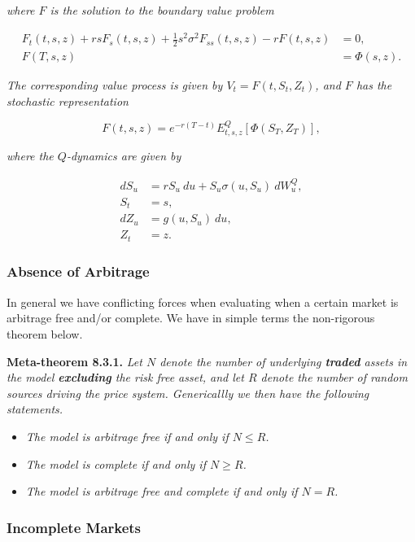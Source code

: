 \documentclass[
]{article}
\providecommand{\tightlist}{%
  \setlength{\itemsep}{0pt}\setlength{\parskip}{0pt}}
\begin{document}
\emph{where \(F\) is the solution to the boundary value problem}

\begin{align*}
F_t(t,s,z)+rsF_s(t,s,z)+\frac{1}{2}s^2\sigma^2F_{ss}(t,s,z)-rF(t,s,z)&=0,\tag{8.33}\\
F(T,s,z)&=\Phi(s,z).\tag{8.33}
\end{align*}

\emph{The corresponding value process is given by \(V_t=F(t,S_t,Z_t)\),
and \(F\) has the stochastic representation}

\[
F(t,s,z)=e^{-r(T-t)}E^Q_{t,s,z}[\Phi(S_T,Z_T)],\tag{8.34}
\]

\emph{where the \(Q\)-dynamics are given by}

\begin{align*}
dS_u&=rS_u\ du + S_u\sigma(u,S_u)\ dW^Q_u,\tag{8.35}\\
S_t&=s,\tag{8.36}\\
dZ_u&=g(u,S_u)\ du,\tag{8.37}\\
Z_t&=z.\tag{8.38}
\end{align*}

\hypertarget{absence-of-arbitrage-1}{%
\subsubsection{Absence of Arbitrage}\label{absence-of-arbitrage-1}}

In general we have conflicting forces when evaluating when a certain
market is arbitrage free and/or complete. We have in simple terms the
non-rigorous theorem below.

\textbf{Meta-theorem 8.3.1.} \emph{Let \(N\) denote the number of
underlying \textbf{traded} assets in the model \textbf{excluding} the
risk free asset, and let \(R\) denote the number of random sources
driving the price system. Genericallly we then have the following
statements.}

\begin{itemize}
\tightlist
\item
  \emph{The model is arbitrage free if and only if \(N\le R\).}
\item
  \emph{The model is complete if and only if \(N\ge R\).}
\item
  \emph{The model is arbitrage free and complete if and only if
  \(N=R\).}
\end{itemize}

\hypertarget{incomplete-markets}{%
\subsubsection{Incomplete Markets}\label{incomplete-markets}}
\end{document}

